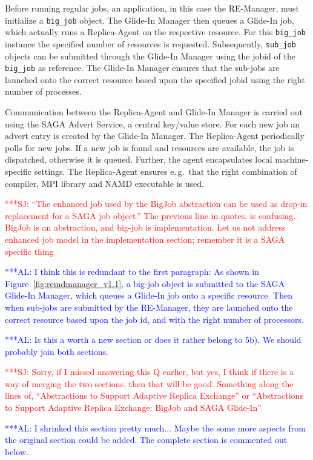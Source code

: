 \documentclass{rspublic}
\newcommand{\alnote}[1]{ {\textcolor{blue} { ***AL: #1 }}}
\newcommand{\jhanote}[1]{ {\textcolor{red} { ***SJ: #1 }}}
\newcommand{\alnote}[1]{}
\newcommand{\jhanote}[1]{}
\newcommand{\replicaagent}[1]{Replica-Agent }
\begin{document}
Before running regular jobs, an application, in this case the 
RE-Manager, must initialize a \texttt{big\_job} object. 
The Glide-In Manager then queues a Glide-In
job, which actually runs a Replica-Agent on the respective resource.  
For this \texttt{big\_job} instance the
specified number of resources is requested. Subsequently,
\texttt{sub\_job} objects can be submitted through the Glide-In
Manager using the jobid of the \texttt{big\_job} as reference.
The Glide-In Manager ensures that the sub-jobs are launched onto the 
correct resource based upon the specified jobid using the right number
of processes.

Communication between the Replica-Agent and Glide-In Manager is
carried out using the SAGA Advert Service, a central key/value
store. For each new job an advert entry is created by the
Glide-In Manager. The \replicaagent\ periodically polls for new jobs.  If a
new job is found and resources are available, the job is dispatched, 
otherwise it is queued. Further, the agent encapsulates
local machine-specific settings. The \replicaagent\
ensures e.\,g.\ that the right combination of compiler, MPI library and NAMD
executable is used.


\jhanote{``The enhanced job used by the BigJob abstraction can be used
  as drop-in replacement for a SAGA job object.'' The previous line in
  quotes, is confusing. BigJob is an abstraction, and big-job is
  implementation. Let us not address enhanced job model in the
  implementation section; remember it is a SAGA specific thing}

\alnote{I think this is redundant to the first paragraph: As 
shown in Figure~\ref{fig:remdmanager_v1.1}, a big-job object is
submitted to the SAGA Glide-In Manager, which queues a Glide-In job
onto a specific resource. Then when sub-jobs are submitted by the
RE-Manager, they are launched onto the correct resource based upon the
job id, and with the right number of processors.  }

\label{sec:adaptivitiy}    
\alnote{Is this a worth a new section or does it rather belong to
  5b). We should probably join both sections.}  

\jhanote{Sorry, if I missed answering this Q earlier, but yes, I think
  if there is a way of merging the two sections, then that will be
  good. Something along the lines of, ``Abstractions to Support
  Adaptive Replica Exchange'' or ``Abstractions to Support Adaptive
  Replica Exchange: BigJob and SAGA Glide-In''}

\alnote{I shrinked this section pretty much... Maybe the some more
    aspects from the original section could be added. The complete
    section is commented out below.}
\end{document}

